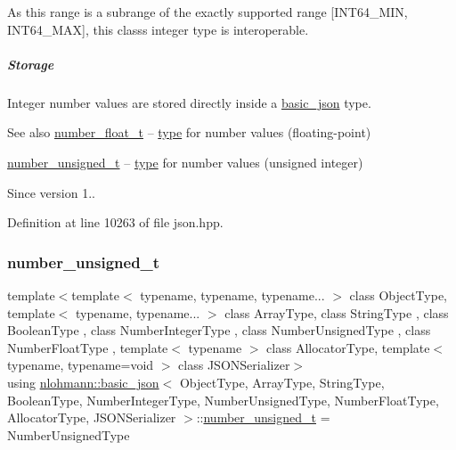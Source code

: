 As this range is a subrange of the exactly supported range \mbox{[}I\+N\+T64\+\_\+\+M\+IN, I\+N\+T64\+\_\+\+M\+AX\mbox{]}, this class\textquotesingle{}s integer type is interoperable.

\subparagraph*{Storage}

Integer number values are stored directly inside a \hyperlink{classnlohmann_1_1basic__json}{basic\+\_\+json} type.

\begin{DoxySeeAlso}{See also}
\hyperlink{classnlohmann_1_1basic__json_a88d6103cb3620410b35200ee8e313d97}{number\+\_\+float\+\_\+t} -- \hyperlink{classnlohmann_1_1basic__json_a2b2d781d7f2a4ee41bc0016e931cadf7}{type} for number values (floating-\/point)

\hyperlink{classnlohmann_1_1basic__json_ab906e29b5d83ac162e823ada2156b989}{number\+\_\+unsigned\+\_\+t} -- \hyperlink{classnlohmann_1_1basic__json_a2b2d781d7f2a4ee41bc0016e931cadf7}{type} for number values (unsigned integer)
\end{DoxySeeAlso}
\begin{DoxySince}{Since}
version 1.. 
\end{DoxySince}


Definition at line 10263 of file json.\+hpp.

\mbox{\label{classnlohmann_1_1basic__json_ab906e29b5d83ac162e823ada2156b989}} 
\subsubsection{\texorpdfstring{number\+\_\+unsigned\+\_\+t}{number\_unsigned\_t}}
{\footnotesize\ttfamily template$<$template$<$ typename, typename, typename... $>$ class Object\+Type, template$<$ typename, typename... $>$ class Array\+Type, class String\+Type , class Boolean\+Type , class Number\+Integer\+Type , class Number\+Unsigned\+Type , class Number\+Float\+Type , template$<$ typename $>$ class Allocator\+Type, template$<$ typename, typename=void $>$ class J\+S\+O\+N\+Serializer$>$ \\
using \hyperlink{classnlohmann_1_1basic__json}{nlohmann\+::basic\+\_\+json}$<$ Object\+Type, Array\+Type, String\+Type, Boolean\+Type, Number\+Integer\+Type, Number\+Unsigned\+Type, Number\+Float\+Type, Allocator\+Type, J\+S\+O\+N\+Serializer $>$\+::\hyperlink{classnlohmann_1_1basic__json_ab906e29b5d83ac162e823ada2156b989}{number\+\_\+unsigned\+\_\+t} =  Number\+Unsigned\+Type}



